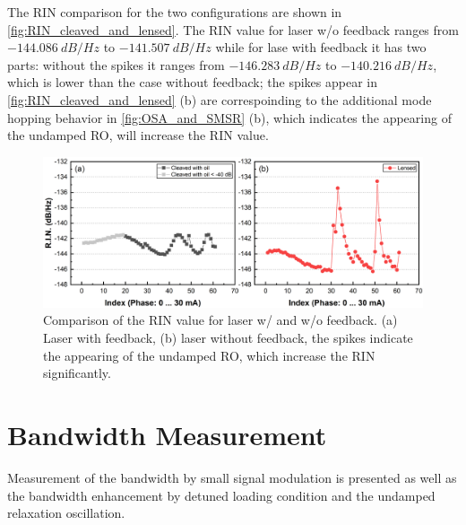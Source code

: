 The RIN comparison for the two configurations are shown in \autoref{fig:RIN_cleaved_and_lensed}. The RIN value for laser w/o feedback ranges from $-144.086 \ dB/Hz$ to $-141.507 \ dB/Hz$ while for lase with feedback it has two parts: without the spikes it ranges from $-146.283 \ dB/Hz$ to $-140.216 \ dB/Hz$, which is lower than the case without feedback; the spikes appear in \autoref{fig:RIN_cleaved_and_lensed} (b) are correspoinding to the additional mode hopping behavior in \autoref{fig:OSA_and_SMSR} (b), which indicates the appearing of the undamped RO, will increase the RIN value.

\begin{figure}[ht]
    \centering
    \includegraphics[width=\linewidth]{figures/RIN_cleaved_and_lensed.png}
    \caption{Comparison of the RIN value for laser w/ and w/o feedback. (a) Laser with feedback, (b) laser without feedback, the spikes indicate the appearing of the undamped RO, which increase the RIN significantly.}
    \label{fig:RIN_cleaved_and_lensed}
\end{figure}

\section{Bandwidth Measurement}\label{sec:bandwidth_measurement}
Measurement of the bandwidth by small signal modulation is presented as well as the bandwidth enhancement by detuned loading condition and the undamped relaxation oscillation.
